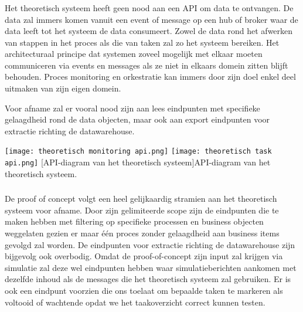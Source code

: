 \subsubsection{}%
\label{subsubsec:api theoretisch systeem}

Het theoretisch systeem heeft geen nood aan een API om data te ontvangen. De data zal immers komen vanuit een event of message op een hub of broker waar de data leeft tot het systeem de data consumeert. Zowel de data rond het afwerken van stappen in het proces als die van taken zal zo het systeem bereiken. Het architecturaal principe dat systemen zoveel mogelijk met elkaar moeten communiceren via events en messages als ze niet in elkaars domein zitten blijft behouden. Proces monitoring en orkestratie kan immers door zijn doel enkel deel uitmaken van zijn eigen domein. \newline

Voor afname zal er vooral nood zijn aan lees eindpunten met specifieke gelaagdheid rond de data objecten, maar ook aan export eindpunten voor extractie richting de datawarehouse.
 
\begin{center}
  \captionsetup{type=figure}
  \texttt{[image: theoretisch monitoring api.png]}
  \texttt{[image: theoretisch task api.png]}
  [API-diagram van het theoretisch systeem]{API-diagram van het theoretisch systeem.}
\end{center}

\subsubsection{}%
\label{subsubsec:api proof-of-concept systeem}
De proof of concept volgt een heel gelijkaardig stramien aan het theoretisch systeem voor afname. Door zijn gelimiteerde scope zijn de eindpunten die te maken hebben met filtering op specifieke processen en business objecten weggelaten gezien er maar één proces zonder gelaagdheid aan business items gevolgd zal worden. De eindpunten voor extractie richting de datawarehouse zijn bijgevolg ook overbodig. Omdat de proof-of-concept zijn input zal krijgen via simulatie zal deze wel eindpunten hebben waar simulatieberichten aankomen met dezelfde inhoud als de messages die het theoretisch systeem zal gebruiken. Er is ook een eindpunt voorzien die ons toelaat om bepaalde taken te markeren als voltooid of wachtende opdat we het taakoverzicht correct kunnen testen.
 
